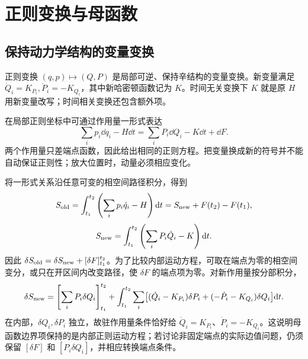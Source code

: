 \documentclass[UTF8,zihao=-4,fontset=fandol,a4paper]{ctexart}
\begin{document}
\section{正则变换与母函数}\label{sec:transform}
\subsection{保持动力学结构的变量变换}
正则变换 $(q,p)\mapsto(Q,P)$ 是局部可逆、保持辛结构的变量变换。新变量满足 $\dot Q_i=K_{P_i},\dot P_i=-K_{Q_i}$，其中新哈密顿函数记为 $K$。时间无关变换下 $K$ 就是原 $H$ 用新变量改写；时间相关变换还包含额外项。

在局部正则坐标中可通过作用量一形式表达
\begin{equation}
\sum_i p_i\dd q_i-H\dd t
=\sum_iP_i\dd Q_i-K\dd t+\dd F.\label{eq:oneform}
\end{equation}
两个作用量只差端点函数，因此给出相同的正则方程。把变量换成新的符号并不能自动保证正则性；放大位置时，动量必须相应变化。

将一形式关系沿任意可变的相空间路径积分，得到
\[
S_{\rm old}=\int_{t_1}^{t_2}\left(\sum_i p_i\dot q_i-H\right)\mathrm d t
=S_{\rm new}+F(t_2)-F(t_1),
\]
\[
S_{\rm new}=\int_{t_1}^{t_2}\left(\sum_iP_i\dot Q_i-K\right)\mathrm d t.
\]
因此 $\delta S_{\rm old}=\delta S_{\rm new}+[\delta F]_{t_1}^{t_2}$。为了比较内部运动方程，可取在端点为零的相空间变分，或只在开区间内改变路径，使 $\delta F$ 的端点项为零。对新作用量按分部积分，
\[
\delta S_{\rm new}
=\left[\sum_iP_i\delta Q_i\right]_{t_1}^{t_2}
+\int_{t_1}^{t_2}\sum_i
\bigl[(\dot Q_i-K_{P_i})\delta P_i
+(-\dot P_i-K_{Q_i})\delta Q_i\bigr]\mathrm d t.
\]
在内部，$\delta Q_i,\delta P_i$ 独立，故驻作用量条件恰好给 $\dot Q_i=K_{P_i}$、$\dot P_i=-K_{Q_i}$。这说明母函数边界项保持的是内部正则运动方程；若讨论非固定端点的实际边值问题，仍须保留 $[\delta F]$ 和 $[P_i\delta Q_i]$，并相应转换端点条件。
\end{document}
